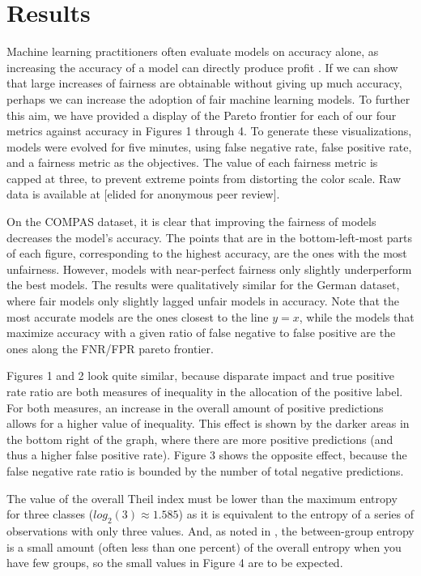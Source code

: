 \documentclass[twoside]{article}
\begin{document}
\section{Results}
Machine learning practitioners often evaluate models on accuracy alone, as increasing the accuracy of a model can directly produce profit \citep{Packer:2018}. If we can show that large increases of fairness are obtainable without giving up much accuracy, perhaps we can increase the adoption of fair machine learning models. To further this aim, we have provided a display of the Pareto frontier for each of our four metrics against accuracy in Figures 1 through 4. To generate these visualizations, models were evolved for five minutes, using false negative rate, false positive rate, and a fairness metric as the objectives. The value of each fairness metric is capped at three, to prevent extreme points from distorting the color scale. Raw data is available at [elided for anonymous peer review]. 

On the COMPAS dataset, it is clear that improving the fairness of models decreases the model’s accuracy. The points that are in the bottom-left-most parts of each figure, corresponding to the highest accuracy, are the ones with the most unfairness. However, models with near-perfect fairness only slightly underperform the best models. The results were qualitatively similar for the German dataset, where fair models only slightly lagged unfair models in accuracy. Note that the most accurate models are the ones closest to the line $ y = x $, while the models that maximize accuracy with a given ratio of false negative to false positive are the ones along the FNR/FPR pareto frontier.

Figures 1 and 2 look quite similar, because disparate impact and true positive rate ratio are both measures of inequality in the allocation of the positive label. For both measures, an increase in the overall amount of positive predictions allows for a higher value of inequality. This effect is shown by the darker areas in the bottom right of the graph, where there are more positive predictions (and thus a higher false positive rate). Figure 3 shows the opposite effect, because the false negative rate ratio is bounded by the number of total negative predictions.

The value of the overall Theil index must be lower than the maximum entropy for three classes ($log_2(3) \approx 1.585$) as it is equivalent to the entropy of a series of observations with only three values. And, as noted in \citep{Speicher:2018}, the between-group entropy is a small amount (often less than one percent) of the overall entropy when you have few groups, so the small values in Figure 4 are to be expected.
\end{document}
